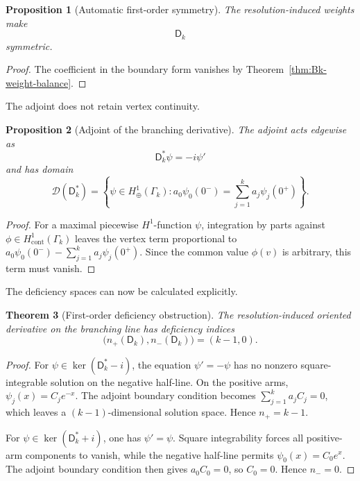 \documentclass[11pt]{article}
\theoremstyle{plain}
\newtheorem{theorem}{Theorem}[section]
\newtheorem{proposition}[theorem]{Proposition}
\theoremstyle{definition}
\begin{document}
\begin{proposition}[Automatic first-order symmetry]
\label{prop:Bk-first-order-symmetry}
The resolution-induced weights make
\[
  \mathsf D_k
\]
symmetric.
\end{proposition}

\begin{proof}
The coefficient in the boundary form vanishes by
Theorem~\ref{thm:Bk-weight-balance}.
\end{proof}

The adjoint does not retain vertex continuity.

\begin{proposition}[Adjoint of the branching derivative]
\label{prop:Bk-adjoint}
The adjoint acts edgewise as
\[
  \mathsf D_k^*\psi=-i\psi'
\]
and has domain
\[
  \mathcal D(\mathsf D_k^*)
  =
  \left\{
    \psi\in H^1_\oplus(\Gamma_k):
    a_0\psi_0(0^-)
    =
    \sum_{j=1}^{k}a_j\psi_j(0^+)
  \right\}.
\]
\end{proposition}

\begin{proof}
For a maximal piecewise \(H^1\)-function \(\psi\), integration by parts
against \(\phi\in H^1_{\mathrm{cont}}(\Gamma_k)\) leaves the vertex term proportional to
\(a_0\psi_0(0^-) - \sum_{j=1}^{k}a_j\psi_j(0^+)\).
Since the common value \(\phi(v)\) is arbitrary, this term must vanish.
\end{proof}

The deficiency spaces can now be calculated explicitly.

\begin{theorem}[First-order deficiency obstruction]
\label{thm:Bk-deficiency}
The resolution-induced oriented derivative on the branching line has deficiency
indices
\[
  \bigl(
    n_+(\mathsf D_k),
    n_-(\mathsf D_k)
  \bigr)
  =
  (k-1,0).
\]
\end{theorem}

\begin{proof}
For
\(\psi\in\ker(\mathsf D_k^*-i)\),
the equation \(\psi'=-\psi\) has no nonzero square-integrable solution on the negative half-line. On the
positive arms,
\(\psi_j(x)=C_je^{-x}\).
The adjoint boundary condition becomes
\(\sum_{j=1}^{k}a_jC_j=0\),
which leaves a \((k-1)\)-dimensional solution space. Hence
\(n_+=k-1\).

For
\(\psi\in\ker(\mathsf D_k^*+i)\),
one has
\(\psi'=\psi\).
Square integrability forces all positive-arm components to vanish, while the
negative half-line permits
\(\psi_0(x)=C_0e^x\).
The adjoint boundary condition then gives
\(a_0C_0=0\),
so \(C_0=0\). Hence
\(n_-=0\).
\end{proof}
\end{document}
